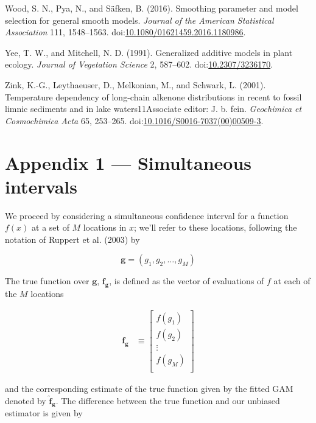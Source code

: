 \documentclass[12pt,]{article}
\begin{document}
\hypertarget{ref-Wood2016-fx}{}
Wood, S. N., Pya, N., and Säfken, B. (2016). Smoothing parameter and
model selection for general smooth models. \emph{Journal of the American
Statistical Association} 111, 1548--1563.
doi:\href{https://doi.org/10.1080/01621459.2016.1180986}{10.1080/01621459.2016.1180986}.

\hypertarget{ref-Yee1991-mg}{}
Yee, T. W., and Mitchell, N. D. (1991). Generalized additive models in
plant ecology. \emph{Journal of Vegetation Science} 2, 587--602.
doi:\href{https://doi.org/10.2307/3236170}{10.2307/3236170}.

\hypertarget{ref-Zink2001-cr}{}
Zink, K.-G., Leythaeuser, D., Melkonian, M., and Schwark, L. (2001).
Temperature dependency of long-chain alkenone distributions in recent to
fossil limnic sediments and in lake waters11Associate editor: J. b.
fein. \emph{Geochimica et Cosmochimica Acta} 65, 253--265.
doi:\href{https://doi.org/10.1016/S0016-7037(00)00509-3}{10.1016/S0016-7037(00)00509-3}.

\hypertarget{appendix}{\section*{Appendix 1 --- Simultaneous
intervals}\label{appendix}}

We proceed by considering a simultaneous confidence interval for a
function \(f(x)\) at a set of \(M\) locations in \(x\); we'll refer to
these locations, following the notation of Ruppert et al. (2003) by

\[
\mathbf{g} = (g_1, g_2, \ldots, g_M)
\]

The true function over \(\mathbf{g}\), \(\mathbf{f_g}\), is defined as
the vector of evaluations of \(f\) at each of the \(M\) locations

\[
\begin{aligned}
    \mathbf{f_g} &\equiv \begin{bmatrix}
           f(g_1) \\
           f(g_2) \\
           \vdots \\
           f({g_M}) \\
         \end{bmatrix}
\end{aligned}
\]

and the corresponding estimate of the true function given by the fitted
GAM denoted by \(\hat{\mathbf{f}}_{\mathbf{g}}\). The difference between
the true function and our unbiased estimator is given by
\end{document}
